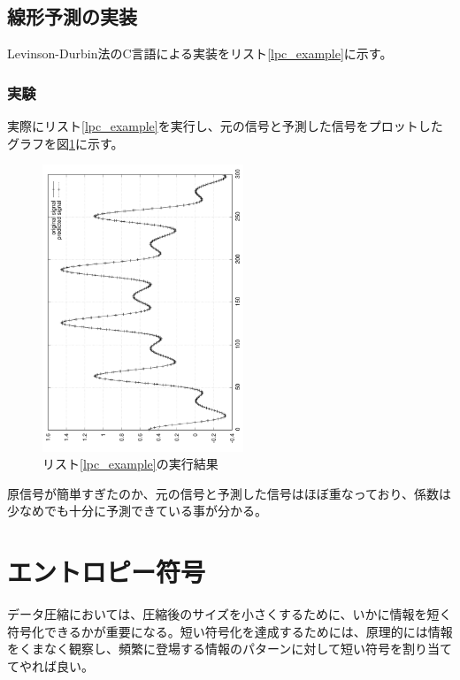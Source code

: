 \documentclass[uplatex,dvipdfmx,b5j,10pt]{jsbook}
\theoremstyle{definition}
\begin{document}
\subsection{線形予測の実装} \label{lpc_example_impl}

Levinson-Durbin法のC言語による実装をリスト\ref{lpc_example}に示す。


\subsubsection{実験}

実際にリスト\ref{lpc_example}を実行し、元の信号と予測した信号をプロットしたグラフを図\ref{lpc_test_result}に示す。
\begin{figure}[htbp]
  \begin{center}
    \includegraphics[width=60mm,angle=-90]{./figs/lpc_test_result.png}
    \caption{リスト\ref{lpc_example}の実行結果} \label{lpc_test_result}
  \end{center}
\end{figure}

原信号が簡単すぎたのか、元の信号と予測した信号はほぼ重なっており、係数は少なめでも十分に予測できている事が分かる。

\section{エントロピー符号}

データ圧縮においては、圧縮後のサイズを小さくするために、いかに情報を短く符号化できるかが重要になる。短い符号化を達成するためには、原理的には情報をくまなく観察し、頻繁に登場する情報のパターンに対して短い符号を割り当ててやれば良い。
\end{document}
